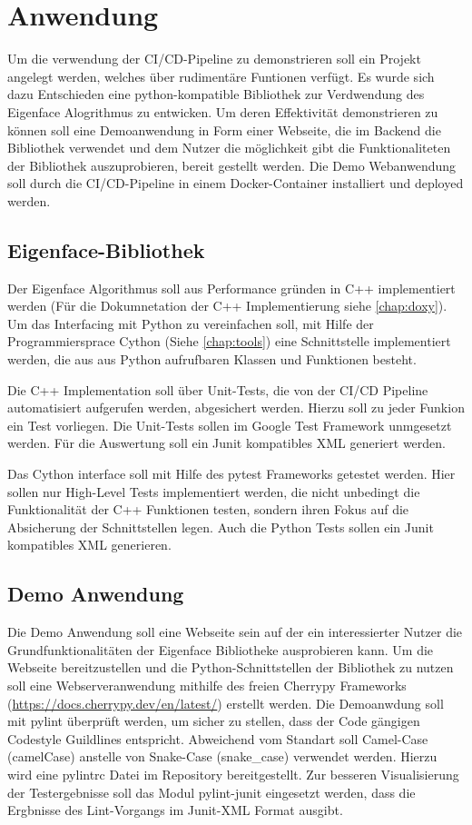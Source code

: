 \chapter{Anwendung}

Um die verwendung der \ac{CI/CD}-Pipeline zu demonstrieren soll ein Projekt angelegt werden, welches über rudimentäre Funtionen verfügt.
Es wurde sich dazu Entschieden eine python-kompatible Bibliothek zur Verdwendung des Eigenface Alogrithmus zu entwicken. Um deren Effektivität demonstrieren zu können soll eine Demoanwendung in Form einer Webseite, die im Backend die Bibliothek verwendet und dem Nutzer die möglichkeit gibt die Funktionaliteten der Bibliothek auszuprobieren, bereit gestellt werden. Die Demo Webanwendung soll durch die \ac{CI/CD}-Pipeline in einem Docker-Container installiert und deployed werden.

\section{Eigenface-Bibliothek}

Der Eigenface Algorithmus soll aus Performance gründen in C++ implementiert werden (Für die Dokumnetation der C++ Implementierung siehe \autoref{chap:doxy}). Um das Interfacing mit Python zu vereinfachen soll, mit Hilfe der Programmiersprace Cython (Siehe \autoref{chap:tools}) eine Schnittstelle implementiert werden, die aus aus Python aufrufbaren Klassen und Funktionen besteht.

Die C++ Implementation soll über Unit-Tests, die von der CI/CD Pipeline automatisiert aufgerufen werden, abgesichert werden. Hierzu soll zu jeder Funkion ein Test vorliegen. Die Unit-Tests sollen im Google Test Framework unmgesetzt werden. Für die Auswertung soll ein Junit kompatibles XML generiert werden.

Das Cython interface soll mit Hilfe des pytest Frameworks getestet werden. Hier sollen nur High-Level Tests implementiert werden, die nicht unbedingt die Funktionalität der C++ Funktionen testen, sondern ihren Fokus auf die Absicherung der Schnittstellen legen. Auch die Python Tests sollen ein Junit kompatibles XML generieren.

\section {Demo Anwendung}

Die Demo Anwendung soll eine Webseite sein auf der ein interessierter Nutzer die Grundfunktionalitäten der Eigenface Bibliotheke ausprobieren kann. Um die Webseite bereitzustellen und die Python-Schnittstellen der Bibliothek zu nutzen soll eine Webserveranwendung mithilfe des freien Cherrypy Frameworks (\url{https://docs.cherrypy.dev/en/latest/}) erstellt werden.
Die Demoanwdung soll mit pylint überprüft werden, um sicher zu stellen, dass der Code gängigen Codestyle Guildlines entspricht. Abweichend vom Standart soll Camel-Case (camelCase) anstelle von Snake-Case (snake\_case) verwendet werden. Hierzu wird eine pylintrc Datei im Repository bereitgestellt. Zur besseren Visualisierung der Testergebnisse soll das Modul pylint-junit eingesetzt werden, dass die Ergbnisse des Lint-Vorgangs im Junit-XML Format ausgibt.
